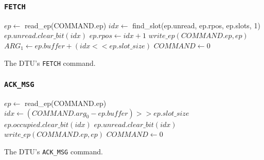 \documentclass[a4paper,11pt,draft]{article}
\begin{document}
\subsubsection{\texttt{FETCH}}

\begin{algorithm}[H]
    $ep \gets$ read\_ep(COMMAND.ep)\;
    \BlankLine
    $idx \gets$ find\_slot(ep.unread, ep.rpos, ep.slots, 1)\;
    $ep.unread.clear\_bit(idx)$\;
    $ep.rpos \gets idx + 1$\;
    $write\_ep(COMMAND.ep, ep)$\;
    \BlankLine
    $ARG_1 \gets ep.buffer + (idx << ep.slot\_size)$\;
    $COMMAND \gets 0$\;
    \caption{The DTU's \texttt{FETCH} command.}
\end{algorithm}

\subsubsection{\texttt{ACK\_MSG}}

\begin{algorithm}[H]
    $ep \gets$ read\_ep(COMMAND.ep)\;
    \BlankLine
    $idx \gets (COMMAND.arg_0 - ep.buffer) >> ep.slot\_size$\;
    $ep.occupied.clear\_bit(idx)$\;
    $ep.unread.clear\_bit(idx)$\;
    $write\_ep(COMMAND.ep, ep)$\;
    \BlankLine
    \BlankLine
    $COMMAND \gets 0$\;
    \caption{The DTU's \texttt{ACK\_MSG} command.}
\end{algorithm}
\end{document}
